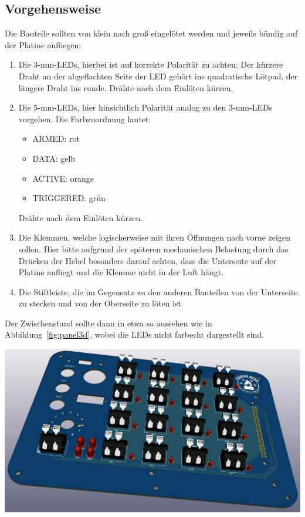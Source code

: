 \documentclass[paper=a4, open=any, numbers=noenddot]{scrbook}
\begin{document}
			\subsection*{Vorgehensweise}
				
				Die Bauteile sollten von klein nach groß eingelötet werden und jeweils bündig auf der Platine aufliegen:
				\begin{enumerate}
					\item Die 3-mm-LEDs, hierbei ist auf korrekte Polarität zu achten: Der kürzere Draht an der abgeflachten Seite der LED gehört ins quadratische Lötpad, der längere Draht ins runde. Drähte nach dem Einlöten kürzen.
					\item Die 5-mm-LEDs, hier hinsichtlich Polarität analog zu den 3-mm-LEDs vorgehen. Die Farbzuordnung lautet:
					      \begin{itemize}
						      \item ARMED: rot
						      \item DATA: gelb
						      \item ACTIVE: orange
						      \item TRIGGERED: grün
					      \end{itemize}
					      Drähte nach dem Einlöten kürzen.
					\item Die Klemmen, welche logischerweise mit ihren Öffnungen nach vorne zeigen sollen. Hier bitte aufgrund der späteren mechanischen Belastung durch das Drücken der Hebel besonders darauf achten, dass die Unterseite auf der Platine aufliegt und die Klemme nicht in der Luft hängt.
					\item Die Stiftleiste, die im Gegensatz zu den anderen Bauteilen von der Unterseite zu stecken und von der Oberseite zu löten ist
				\end{enumerate}

				Der Zwischenstand sollte dann in etwa so aussehen wie in Abbildung~\ref{fig:panel3d}, wobei die LEDs nicht farbecht dargestellt sind.
				
				\begin{center}
					\includegraphics[width=.8\textwidth]{Bilder/panel3d}
					\label{fig:panel3d}
				\end{center}
			
\end{document}
